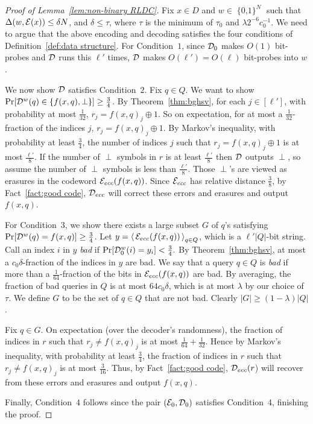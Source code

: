 \documentclass[11pt,english]{article}
\theoremstyle{definition}
\theoremstyle{remark}
\newcommand{\D}{{\cal D}}
\newcommand{\E}{{\cal E}}
\newcommand{\cube}{\operatorname{\{0, 1\}}}
\begin{document}
\begin{proof}[Proof of Lemma~\ref{lem:non-binary RLDC}]
Fix $x\in{D}$ and $w\in\cube^{N}$ such that $\Delta(w,\E(x))\leq\delta N$,
and $\delta\leq\tau$, where $\tau$ is the minimum of $\tau_{0}$
and $\lambda2^{-6}c_0^{-1}$. We need to argue that the above encoding
and decoding satisfies the four conditions of Definition~\ref{def:data structure}.
For Condition~$1$, since $\D_{0}$ makes $O(1)$ bit-probes and $\D$
runs this $\ell'$ times, $\D$ makes $O(\ell')=O(\ell)$ bit-probes into
$w$.

We now show $\D$ satisfies Condition~$2$. Fix $q\in Q$. We want
to show $\Pr[\D^{w}(q)\in\{f(x,q),\perp\}]\geq\frac{3}{4}$. By Theorem~\ref{thm:bghsv},
for each $j\in[\ell']$, with probability at most $\frac{1}{32}$,
$r_{j}=f(x,q)_{j}\oplus1$. So on expectation, for at most a $\frac{1}{32}$-fraction
of the indices $j$, $r_{j}=f(x,q)_{j}\oplus1$. By Markov's inequality,
with probability at least $\frac{3}{4}$, the number of indices $j$ such
that $r_{j}=f(x,q)_{j}\oplus1$ is at most $\frac{\ell'}{8}$. If
the number of $\perp$ symbols in $r$ is at least $\frac{\ell'}{8}$
then $\D$ outputs $\perp$, so assume the number of $\perp$ symbols
is less than $\frac{\ell'}{8}$. Those $\perp$'s are viewed as erasures
in the codeword $\E_{ecc}(f(x,q))$. Since $\E_{ecc}$ has relative
distance $\frac{3}{8}$, by Fact~\ref{fact:good code}, $\D_{ecc}$
will correct these errors and erasures and output $f(x,q)$.

For Condition~$3$, we show there exists a large subset $G$ of $q$'s
satisfying $\Pr[\D^{w}(q)=f(x,q)]\geq\frac{3}{4}$. Let $y=\left\langle \,\E_{ecc}(f(x,q))\,\right\rangle _{q\in Q}$,
which is a $\ell'|Q|$-bit string. Call an index $i$ in $y$ \emph{bad}
if $\Pr[\D_{0}^{w}(i)=y_{i}]<\frac{3}{4}.$ By Theorem~\ref{thm:bghsv},
at most a $c_{0}\delta$-fraction of the indices in $y$ are bad.
We say that a query $q\in Q$ is \emph{bad} if more than a $\frac{1}{64}$-fraction
of the bits in $\E_{ecc}(f(x,q))$ are bad. By averaging, the fraction of bad queries in $Q$ is at most 
$64c_{0}\delta$, which is at most $\lambda$ by our choice of $\tau$. 
We define $G$ to be the set of $q\in Q$ that are not bad. Clearly $|G|\geq (1-\lambda) |Q|$.

Fix $q\in G$. On expectation (over the decoder's randomness), the fraction of indices
in $r$ such that $r_{j}\neq f(x,q)_{j}$ is at most $\frac{1}{64}+\frac{1}{32}$. 
Hence by Markov's inequality,
with probability at least $\frac{3}{4}$, the fraction
of indices in $r$ such that $r_{j}\neq f(x,q)_{j}$ is at most $\frac{3}{16}$. 
Thus, by Fact~\ref{fact:good code}, $\D_{ecc}(r$) will recover from these
errors and erasures and output $f(x,q)$.

Finally, Condition~$4$ follows since the pair $(\E_{0},\D_{0})$
satisfies Condition~4, finishing the proof.
\end{proof} 
\end{document}
